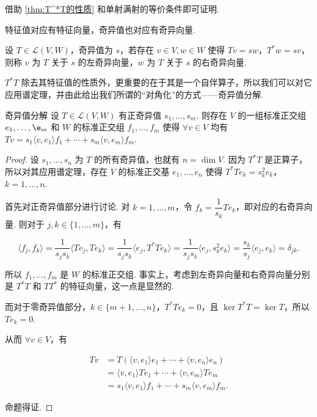 借助 \ref*{thm:T^*T的性质} 和单射满射的等价条件即可证明.

特征值对应有特征向量，奇异值也对应有奇异向量.

\begin{definition}{}{}
    设 $ T \in \mathcal{L}(V, W) $，奇异值为 $ s $，若存在 $ v \in V, w \in W $ 使得 $ Tv = sw $，$ T^*w = sv $，则称 $ v $ 为 $ T $ 关于 $ s $ 的左奇异向量，$ w $ 为 $ T $ 关于 $ s $ 的右奇异向量.
\end{definition}

$ T^*T $ 除去其特征值的性质外，更重要的在于其是一个自伴算子，所以我们可以对它应用谱定理，并由此给出我们所谓的“对角化”的方式——奇异值分解.

\begin{theorem}{奇异值分解}{} 
    设 $ T \in \mathcal{L}(V, W) $ 有正奇异值 $ s_1, \ldots , s_m $. 则存在 $ V $ 的一组标准正交组 $ e_1, \ldots, \e_m $ 和 $ W $ 的标准正交组 $ f_1, \ldots, f_m $ 使得 $ \forall v \in V $ 均有$ Tv = s_1 \langle v, e_1 \rangle f_1 + \cdots + s_m \langle v, e_m \rangle f_m $.
\end{theorem}

\begin{proof}
    设 $ s_1, \ldots, s_n $ 为 $ T $ 的所有奇异值，也就有 $ n = \dim V $. 因为 $ T^*T $ 是正算子，所以对其应用谱定理，存在 $ V $ 的标准正交基 $ e_1, \ldots, e_n $ 使得 $ T^*Te_k = s_k^2e_k $，$ k = 1, \ldots, n $.

    首先对正奇异值部分进行讨论. 对 $ k = 1, \ldots, m $，令 $ f_k = \dfrac{1}{s_k}Te_k $，即对应的右奇异向量. 则对于 $j, k \in \{1, \ldots, m\}$，有

    \[
        \langle f_j, f_k \rangle = \frac{1}{s_j s_k} \langle Te_j, Te_k \rangle = \frac{1}{s_j s_k} \langle e_j, T^*Te_k \rangle = \frac{1}{s_j s_k} \langle e_j, s_k^2e_k \rangle = \frac{s_k}{s_j} \langle e_j, e_k \rangle = \delta_{jk}.
    \]

    所以 $ f_1, \ldots, f_m $ 是 $ W $ 的标准正交组. 事实上，考虑到左奇异向量和右奇异向量分别是 $ T^*T $ 和 $ TT^* $ 的特征向量，这一点是显然的.

    而对于零奇异值部分，$k \in \{m+1, \ldots, n\}$，$ T^*Te_k = 0 $，且 $ \ker T^*T = \ker T $，所以 $ Te_k = 0 $.

    从而 $ \forall v \in V $，有

    \begin{align*}
        Tv & = T(\langle v, e_1 \rangle e_1 + \cdots + \langle v, e_n \rangle e_n)       \\
           & = \langle v, e_1 \rangle Te_1 + \cdots + \langle v, e_m \rangle Te_m        \\
           & = s_1 \langle v, e_1 \rangle f_1 + \cdots + s_m \langle v, e_m \rangle f_m.
    \end{align*}

    命题得证.
\end{proof}

